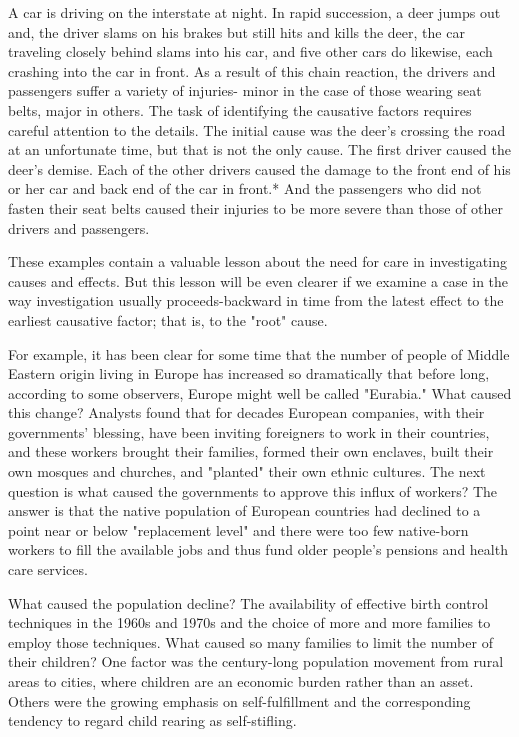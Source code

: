 \documentclass{book}
\begin{document}
A car is driving on the interstate at night. In rapid succession, a deer jumps out and, the driver slams on his brakes but still hits and kills the deer, the car traveling closely behind slams into his car, and five other cars do likewise, each crashing into the car in front. As a result of this chain reaction, the drivers and passengers suffer a variety of injuries- minor in the case of those wearing seat belts, major in others. The task of identifying the causative factors requires careful attention to the details. The initial cause was the deer’s crossing the road at an unfortunate time, but that is not the only cause. The first driver caused the deer’s demise. Each of the other drivers caused the damage to the front end of his or her car and back end of the car in front.* And the passengers who did not fasten their seat belts caused their injuries to be more severe than those of other drivers and passengers.

These examples contain a valuable lesson about the need for care in investigating causes and effects. But this lesson will be even clearer if we examine a case in the way investigation usually proceeds-backward in time from the latest effect to the earliest causative factor; that is, to the "root" cause.

For example, it has been clear for some time that the number of people of Middle Eastern origin living in Europe has increased so dramatically that before long, according to some observers, Europe might well be called "Eurabia." What caused this change? Analysts found that for decades European companies, with their governments’ blessing, have been inviting foreigners to work in their countries, and these workers brought their families, formed their own enclaves, built their own mosques and churches, and "planted" their own ethnic cultures. The next question is what caused the governments to approve this influx of workers? The answer is that the native population of European countries had declined to a point near or below "replacement level" and there were too few native-born workers to fill the available jobs and thus fund older people’s pensions and health care services.

What caused the population decline? The availability of effective birth control techniques in the 1960s and 1970s and the choice of more and more families to employ those techniques. What caused so many families to limit the number of their children? One factor was the century-long population movement from rural areas to cities, where children are an economic burden rather than an asset. Others were the growing emphasis on self-fulfillment and the corresponding tendency to regard child rearing as self-stifling.
\end{document}
